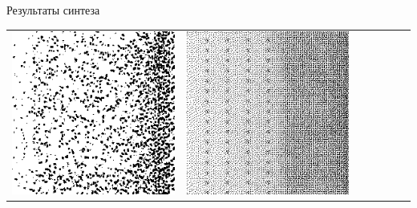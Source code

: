 \documentclass[12pt]{beamer}
\begin{document}
\begin{frame}{Результаты синтеза}
\begin{table}
\begin{center}
\begin{tabular}{p{1.2cm} p{1.2cm} p{1.2cm} p{1.2cm} p{1.2cm} p{1.2cm} p{1.2cm}}
					\includegraphics[width=1\linewidth]{8-results/sand-trend8/nf32e5/gen2}
					&
					\includegraphics[width=1\linewidth]{8-results/sand-trend8/nf64e1/gen2}
					&

\end{tabular}
\end{center}
\end{table}
\end{frame}
\end{document}
